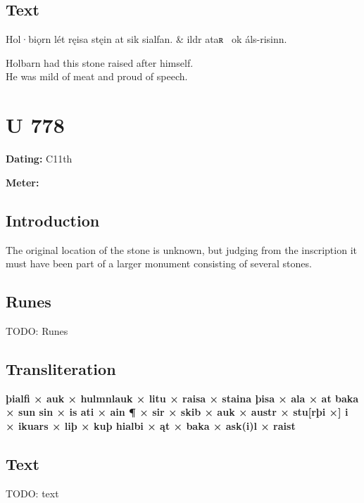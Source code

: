 \subsection{Text}

\bvg\bva[]%
Hol·biǫrn lét ręisa stęin at sik sialfan. &
 ildr ataʀ \hld\ ok áls-risinn.\eva

\bvb Holbarn had this stone raised after himself. \\
He was mild of meat and proud of speech.\evb\evg

\sectionline\clearpage


\section{U 778}

\begin{flushright}%
\textbf{Dating:} C11th

\textbf{Meter:} \Fornyrdislag
\end{flushright}%

\subsection{Introduction}

The original location of the stone is unknown, but judging from the inscription it must have been part of a larger monument consisting of several stones.

\subsection{Runes}

TODO: Runes%

\subsection{Transliteration}

\textbf{þialfi × auk × hulmnlauk × litu × raisa × staina þisa × ala × at baka × sun sin × is ati × ain ¶ × sir × skib × auk × austr × stu[rþi ×] i × ikuars × liþ × kuþ hialbi × ąt × baka × ask(i)l × raist}

\subsection{Text}

\bpg\bpa[0]%
TODO: text\epa

